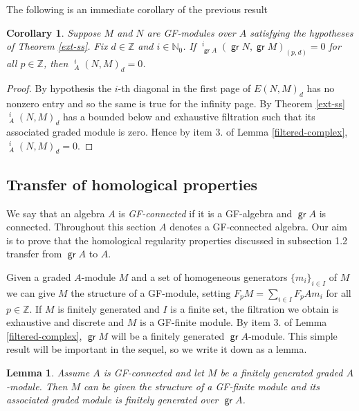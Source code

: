 \documentclass[11pt,fleqn]{article}
\theoremstyle{plain}
\newtheorem{Lemma}[Theorem]{Lemma}
\newtheorem{Corollary}[Theorem]{Corollary}
\theoremstyle{remark}
\theoremstyle{definition}
\newcommand\NN{\mathbb N}
\newcommand\ZZ{\mathbb Z}
\DeclareMathOperator\GrExt{\underline{\mathsf{Ext}}}
\DeclareMathOperator\gr{\mathsf{gr}}
\begin{document}
The following is an immediate corollary of the previous result
\begin{Corollary}
\label{zero-lemma}
	Suppose $M$ and $N$ are GF-modules over $A$ satisfying the hypotheses of
	Theorem \ref{ext-ss}. Fix $d \in \ZZ$ and $i \in \NN_0$. If $\GrExt_{\gr A}^i(\gr N, 
	\gr M)_{(p,d)} = 0$ for all $p \in \ZZ$, then $\GrExt_A^i(N,M)_d = 0$.
\end{Corollary}
\begin{proof}
	By hypothesis the $i$-th diagonal in the first page of $E(N,M)_d$
	has no nonzero entry and so the same is true for the infinity page. By Theorem
	\ref{ext-ss} $\GrExt_A^i(N,M)_d$ has a bounded below and exhaustive filtration such 
	that its associated graded module is zero. Hence by item 3. of Lemma
	\ref{filtered-complex}, $\GrExt_A^i(N,M)_d = 0$.
\end{proof}


\subsection{Transfer of homological properties}
We say that an algebra $A$ is \emph{GF-connected} if it is a GF-algebra and $\gr A$ is
connected. Throughout this section $A$ denotes a GF-connected algebra. Our aim is to prove
that the homological regularity properties discussed in subsection 1.2 transfer from $\gr
A$ to $A$.

Given a graded $A$-module $M$ and a set of homogeneous generators $\{m_i\}_{i \in I}$ of
$M$ we can give $M$ the structure of a GF-module, setting $F_pM = \sum_{i \in I} F_pA
m_i$ for all $p \in \ZZ$. If $M$ is finitely generated and $I$ is a finite set, the
filtration we obtain is exhaustive and discrete and $M$ is a GF-finite module. By item 3.
of Lemma \ref{filtered-complex}, $\gr M$ will be a finitely generated $\gr A$-module. This 
simple result will be important in the sequel, so we write it down as a lemma.
\begin{Lemma}
\label{GF-structure}
  Assume $A$ is GF-connected and let $M$ be a finitely generated graded $A$-module. Then
  $M$ can be given the structure of a GF-finite module and its associated graded module is
  finitely generated over $\gr A$.
\end{Lemma}
\end{document}
